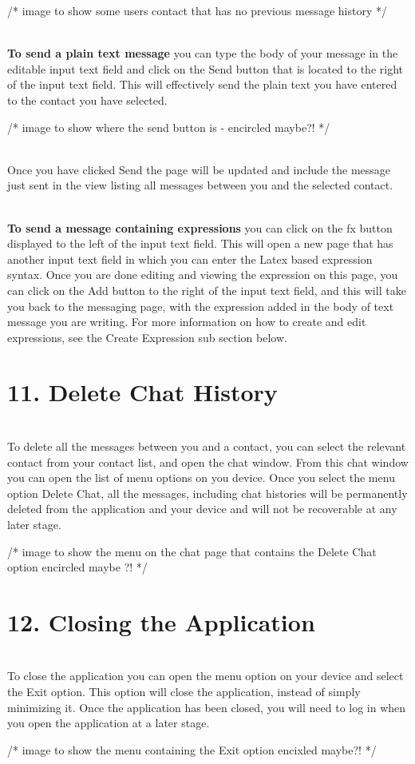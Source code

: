 \documentclass[29pt,a4paper]{moderncv}
\begin{document}
				/* image to show some users contact that has no previous message history */  
				
			\\	\textbf{To send a plain text message} you can type the body of your message in the editable input text field and click on the Send button that is located to the right of the input text field. This will effectively send the plain text you have entered to the contact you have selected. 
				
				/* image to show  where the send button is - encircled maybe?! */ 
				
				\\Once you have clicked Send the page will be updated and include the message just sent in the view listing all messages between you and the selected contact.
				
			\\	\textbf{To send a message containing expressions} you can click on the fx button displayed to the left of the input text field.  This will open a new page that has another input text field in which you can enter the Latex based expression syntax. Once you are done editing and viewing the expression on this page, you can click on the Add button to the right of the input text field, and this will take you back to the messaging page, with the expression added in the body of text message you are writing. For more information on how to create and edit expressions, see the Create Expression sub section below.
				\vspace{4mm}
		
		\section*{11. Delete Chat History}
			\vspace{5mm}
			\\To delete all the messages between you and a contact, you can select the relevant contact from your contact list, and open the chat window.  From this chat window you can open the list of menu options on you device.  Once you select the menu option Delete Chat, all the messages, including chat histories will be permanently deleted from the application and your device and will not be recoverable at any later stage. 
			
			/* image to show the menu on the chat page that contains the Delete Chat option encircled maybe ?! */
			\vspace{5mm}
			
			\section*{12. Closing the Application}
				\vspace{5mm}
				\\To close the application you can open the menu option on your device and select the Exit option.  This option will close the application, instead of simply minimizing it.  Once the application has been closed, you will need to log in when you open the application at a later stage.
				
				/* image to show the menu containing the Exit option encixled maybe?! */
				\vspace{4mm}
		
\end{document}

